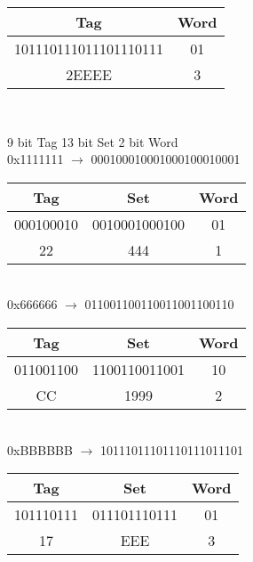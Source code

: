 \documentclass[12pt,largemargins]{homework}
\begin{document}
\begin{alphaparts}
\begin{tabular}{|c|c|}
\hline
Tag&Word\\
\hline
101110111011101110111&01\\
\hline
2EEEE&3\\
\hline
\end{tabular}\\
\item
9 bit Tag 13 bit Set 2 bit Word\\
0x1111111 $\rightarrow$ 000100010001000100010001\\
\begin{tabular}{|c|c|c|}
\hline
Tag&Set&Word\\
\hline
000100010&0010001000100&01\\
\hline
22&444&1\\
\hline
\end{tabular}\\
0x666666 $\rightarrow$ 011001100110011001100110\\
\begin{tabular}{|c|c|c|}
\hline
Tag&Set&Word\\
\hline
011001100&1100110011001&10\\
\hline
CC&1999&2\\
\hline
\end{tabular}\\
0xBBBBBB $\rightarrow$ 10111011101110111011101\\
\begin{tabular}{|c|c|c|}
\hline
Tag&Set&Word\\
\hline
101110111&011101110111&01\\
\hline
17&EEE&3\\
\hline
\end{tabular}\\
\end{alphaparts}
\end{document}
